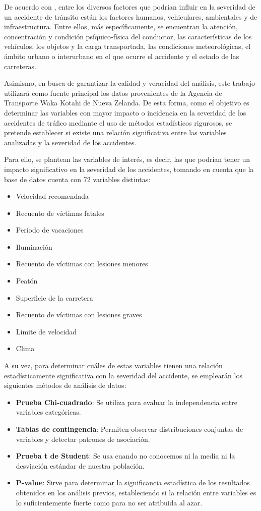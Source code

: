 \documentclass{book}
\begin{document}
De acuerdo con \cite{BuitragoRamírezFrancisco2019Vpdv}, entre los diversos factores que podrían influir en la severidad de un accidente de tránsito están los factores humanos, vehiculares, ambientales y de infraestructura. Entre ellos, más específicamente, se encuentran la atención, concentración y condición psíquico-física del conductor, las características de los vehículos, los objetos y la carga transportada, las condiciones meteorológicas, el ámbito urbano o interurbano en el que ocurre el accidente y el estado de las carreteras.

Asimismo, en busca de garantizar la calidad y veracidad del análisis, este trabajo utilizará como fuente principal los datos provenientes de la Agencia de Transporte Waka Kotahi de Nueva Zelanda. De esta forma, como el objetivo es determinar las variables con mayor impacto o incidencia en la severidad de los accidentes de tráfico mediante el uso de métodos estadísticos rigurosos, se pretende establecer si existe una relación significativa entre las variables analizadas y la severidad de los accidentes.

Para ello, se plantean las variables de interés, es decir, las que podrían tener un impacto significativo en la severidad de los accidentes, tomando en cuenta que la base de datos cuenta con 72 variables distintas:

\begin{itemize}
\item Velocidad recomendada
\item Recuento de víctimas fatales
\item Período de vacaciones
\item Iluminación
\item Recuento de víctimas con lesiones menores
\item Peatón
\item Superficie de la carretera
\item Recuento de víctimas con lesiones graves
\item Límite de velocidad
\item Clima
\end{itemize}

A su vez, para determinar cuáles de estas variables tienen una relación estadísticamente significativa con la severidad del accidente, se emplearán los siguientes métodos de análisis de datos:

\begin{itemize}
\item \textbf{Prueba Chi-cuadrado}: Se utiliza para evaluar la independencia entre variables categóricas.
\item \textbf{Tablas de contingencia}: Permiten observar distribuciones conjuntas de variables y detectar patrones de asociación.
\item \textbf{Prueba t de Student}: Se usa cuando no conocemos ni la media ni la desviación estándar de nuestra población.
\item \textbf{P-value}: Sirve para determinar la significancia estadística de los resultados obtenidos en los análisis previos, estableciendo si la relación entre variables es lo suficientemente fuerte como para no ser atribuida al azar.
\end{itemize}
\end{document}

